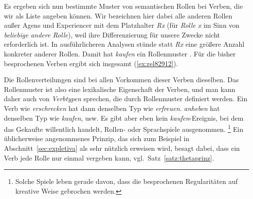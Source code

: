 \Enl[2]


\Unstretch


Es ergeben sich nun bestimmte Muster von semantischen Rollen bei Verben, die wir als Liste angeben können.
Wir bezeichnen hier dabei alle anderen Rollen außer Agens und Experiencer mit dem Platzhalter \textit{Rx} (für \textit{Rolle x} im Sinn von \textit{beliebige andere Rolle}), weil ihre Differenzierung für unsere Zwecke nicht erforderlich ist.
In ausführlicheren Analysen stünde statt \textit{Rx} eine größere Anzahl konkreter anderer Rollen.
Damit hat \zB \textit{kaufen} ein Rollenmuster .
Für die bisher besprochenen Verben ergibt sich insgesamt (\ref{ex:rel82912}).

\begin{exe}
  \ex\label{ex:rel82912}
  \begin{xlist}
  \end{xlist}
\end{exe}

Die Rollenverteilungen sind bei allen Vorkommen dieser Verben dieselben.
Das Rollenmuster ist also eine lexikalische Eigenschaft der Verben, und man kann daher auch von \textit{Verbtypen} sprechen, die durch Rollenmuster definiert werden.
Ein Verb wie \textit{erschrecken} hat dann denselben Typ wie \textit{erfreuen}.
\textit{anheben} hat denselben Typ wie \textit{kaufen}, usw.
Es gibt aber eben kein \textit{kaufen}-Ereignis, bei dem das Gekaufte willentlich handelt, Rollen- oder Sprachspiele ausgenommen.%
\footnote{Solche Spiele leben gerade davon, dass die besprochenen Regularitäten auf kreative Weise gebrochen werden.}
Ein üblicherweise angenommenes Prinzip, das sich zum Beispiel in Abschnitt~\ref{sec:expletiva} als sehr nützlich erweisen wird, besagt dabei, dass ein Verb jede Rolle nur einmal vergeben kann, vgl.\ Satz~\ref{satz:thetaprinz}.

